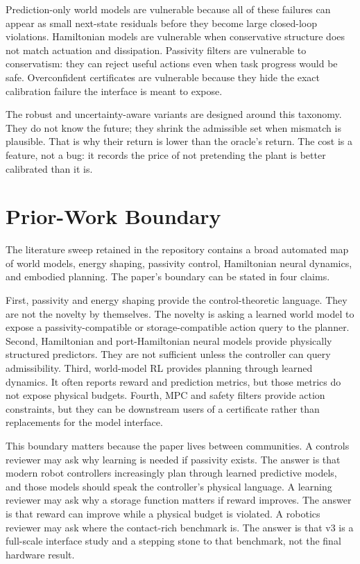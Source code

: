 \documentclass{article}
\begin{document}
Prediction-only world models are vulnerable because all of these failures can appear as small next-state residuals before they become large closed-loop violations. Hamiltonian models are vulnerable when conservative structure does not match actuation and dissipation. Passivity filters are vulnerable to conservatism: they can reject useful actions even when task progress would be safe. Overconfident certificates are vulnerable because they hide the exact calibration failure the interface is meant to expose.

The robust and uncertainty-aware variants are designed around this taxonomy. They do not know the future; they shrink the admissible set when mismatch is plausible. That is why their return is lower than the oracle's return. The cost is a feature, not a bug: it records the price of not pretending the plant is better calibrated than it is.

\clearpage
\section{Prior-Work Boundary}

The literature sweep retained in the repository contains a broad automated map of world models, energy shaping, passivity control, Hamiltonian neural dynamics, and embodied planning. The paper's boundary can be stated in four claims.

First, passivity and energy shaping provide the control-theoretic language. They are not the novelty by themselves. The novelty is asking a learned world model to expose a passivity-compatible or storage-compatible action query to the planner. Second, Hamiltonian and port-Hamiltonian neural models provide physically structured predictors. They are not sufficient unless the controller can query admissibility. Third, world-model RL provides planning through learned dynamics. It often reports reward and prediction metrics, but those metrics do not expose physical budgets. Fourth, MPC and safety filters provide action constraints, but they can be downstream users of a certificate rather than replacements for the model interface.

This boundary matters because the paper lives between communities. A controls reviewer may ask why learning is needed if passivity exists. The answer is that modern robot controllers increasingly plan through learned predictive models, and those models should speak the controller's physical language. A learning reviewer may ask why a storage function matters if reward improves. The answer is that reward can improve while a physical budget is violated. A robotics reviewer may ask where the contact-rich benchmark is. The answer is that v3 is a full-scale interface study and a stepping stone to that benchmark, not the final hardware result.
\end{document}
